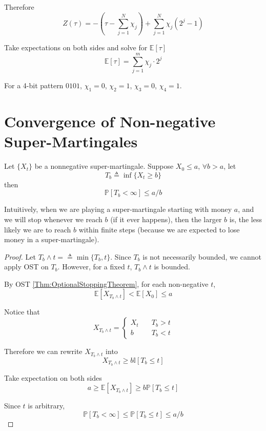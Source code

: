             Therefore
            \[Z(\tau) = -\left(\tau - \sum_{j=1}^N \chi_j\right) + \sum_{j=1}^N \chi_j(2^j-1)\]

            Take expectations on both sides and solve for $\mathbb{E}[\tau]$
            \[\mathbb{E}[\tau] = \sum_{j=1}^m\chi_j \cdot 2^j\]

            For a 4-bit pattern $0101$, $\chi_1=0$, $\chi_2 = 1$, $\chi_3=0$, $\chi_4=1$.


\section{Convergence of Non-negative Super-Martingales}
    \begin{proposition}\label{Prop:BoundOnSuperMartingale}
        Let $\{X_t\}$ be a nonnegative super-martingale. Suppose $X_0 \le a $, $\forall b > a$, let
        \[ T_b \triangleq \inf\{ X_t \ge b \} \]
        then
        \[ \mathbb{P}[T_b < \infty] \le a/b \]
    \end{proposition}

    Intuitively, when we are playing a super-martingale starting with money $a$, and we will stop whenever we reach $b$ (if it ever happens), then the larger $b$ is, the less likely we are to reach $b$ within finite steps (because we are expected to lose money in a super-martingale).

    \begin{proof}
        Let $T_b \wedge t =\triangleq \min\{T_b, t\}$. Since $T_b$ is not necessarily bounded, we cannot apply OST on $T_b$. However, for a fixed $t$, $T_b \wedge t$ is bounded.

        By OST \ref{Thm:OptionalStoppingTheorem}, for each non-negative $t$,
        \[ \mathbb{E}[X_{T_b \wedge t}] < \mathbb{E}[X_0] \le a \]

        Notice that
        \[ X_{T_b \wedge t} = \begin{cases}
            X_t &\quad T_b > t\\
            b &\quad T_b < t
        \end{cases} \]

        Therefore we can rewrite $X_{T_b \wedge t}$ into
        \[ X_{T_b \wedge t} \ge b\mathbb{I}[T_b \le t] \]

        Take expectation on both sides
        \[ a \ge \mathbb{E}[X_{T_b \wedge t}] \ge b\mathbb{P}[T_b \le t] \]

        Since $t$ is arbitrary,
        \[ \mathbb{P}[T_b < \infty] \le \mathbb{P}[T_b \le t] \le a/b \]
    \end{proof}


